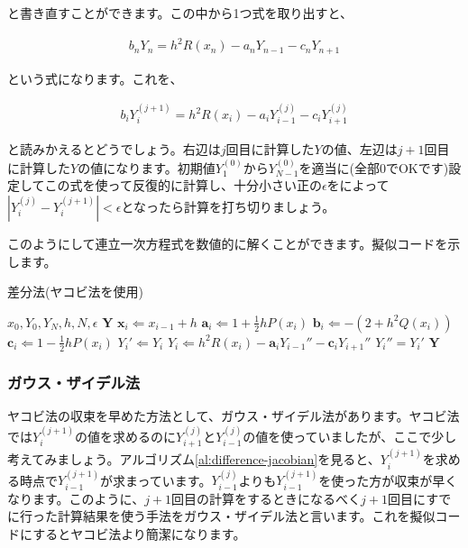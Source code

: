 \noindent
と書き直すことができます。この中から1つ式を取り出すと、

\begin{eqnarray}
    b_nY_n=h^2R(x_n)-a_nY_{n-1}-c_nY_{n+1}
\end{eqnarray}

\noindent
という式になります。これを、

\begin{eqnarray}
    b_iY_i^{(j+1)}=h^2R(x_i)-a_iY_{i-1}^{(j)}-c_iY_{i+1}^{(j)}
\end{eqnarray}

\noindent
と読みかえるとどうでしょう。右辺は$j$回目に計算した$Y$の値、左辺は$j+1$回目に計算した$Y$の値になります。初期値$Y_1^{(0)}$から$Y_{N-1}^{(0)}$を適当に(全部0でOKです)設定してこの式を使って反復的に計算し、十分小さい正の$\epsilon$をによって$|Y_i^{(j)}-Y_i^{(j+1)}|<\epsilon$となったら計算を打ち切りましょう。

このようにして連立一次方程式を数値的に解くことができます。擬似コードを示します。

\begin{algorithm}
\label{al:difference-jacobian}
\caption{差分法(ヤコビ法を使用)}
\begin{algorithmic}
\REQUIRE $x_0,Y_0,Y_N,h,N,\epsilon$
\ENSURE $\boldsymbol{Y}$
    \STATE $\boldsymbol{x}_i\Leftarrow x_{i-1}+h$
    \STATE $\boldsymbol{a}_i\Leftarrow 1+\frac{1}{2}hP(x_i)$
    \STATE $\boldsymbol{b}_i\Leftarrow -(2+h^2Q(x_i))$
    \STATE $\boldsymbol{c}_i\Leftarrow 1-\frac{1}{2}hP(x_i)$
\ENDFOR
{}
        \STATE $Y_i'\Leftarrow Y_i$
        \STATE $Y_i\Leftarrow h^2R(x_i)-\boldsymbol{a}_iY_{i-1}''-\boldsymbol{c}_iY_{i+1}''$
    \ENDFOR
\ENDWHILE
{}
    \STATE $Y_i''=Y_i'$
\ENDFOR
\RETURN $\boldsymbol{Y}$
\end{algorithmic}
\end{algorithm}








\subsubsection{ガウス・ザイデル法}
\label{gauss-seidel}
ヤコビ法の収束を早めた方法として、ガウス・ザイデル法があります。ヤコビ法では$Y_i^{(j+1)}$の値を求めるのに$Y_{i+1}^{(j)}$と$Y_{i-1}^{(j)}$の値を使っていましたが、ここで少し考えてみましょう。アルゴリズム\ref{al:difference-jacobian}を見ると、$Y_i^{(j+1)}$を求める時点で$Y_{i-1}^{(j+1)}$が求まっています。$Y_{i-1}^{(j)}$よりも$Y_{i-1}^{(j+1)}$を使った方が収束が早くなります。このように、$j+1$回目の計算をするときになるべく$j+1$回目にすでに行った計算結果を使う手法をガウス・ザイデル法と言います。これを擬似コードにするとヤコビ法より簡潔になります。

